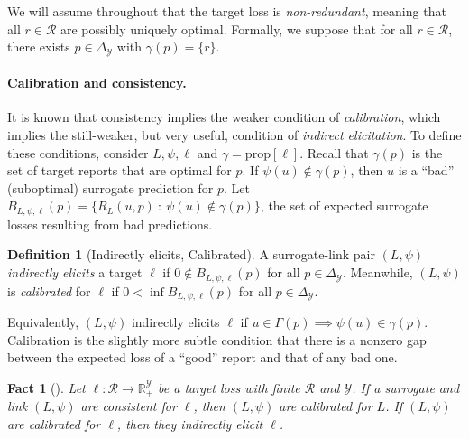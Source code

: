 \documentclass{article}
\newtheorem{fact}{Fact}
\theoremstyle{definition}\newtheorem{definition}{Definition}
\theoremstyle{definition}\newtheorem{assumption}{Assumption}
\newcommand{\reals}{\mathbb{R}}
\newcommand{\prop}[1]{\mathrm{prop}[#1]}
\newcommand{\simplex}{\Delta_\Y}
\newcommand{\R}{\mathcal{R}}
\newcommand{\Y}{\mathcal{Y}}
\begin{document}
We will assume throughout that the target loss is \emph{non-redundant}, meaning that all $r \in \R$ are possibly uniquely optimal.
Formally, we suppose that for all $r \in \R$, there exists $p \in \simplex$ with $\gamma(p) = \{r\}$.

\paragraph{Calibration and consistency.}
It is known that consistency implies the weaker condition of \emph{calibration}, which implies the still-weaker, but very useful, condition of \emph{indirect elicitation}.
To define these conditions, consider $L,\psi,\ell$ and $\gamma = \prop{\ell}$.
Recall that $\gamma(p)$ is the set of target reports that are optimal for $p$.
If $\psi(u) \not\in \gamma(p)$, then $u$ is a ``bad'' (suboptimal) surrogate prediction for $p$.
Let $B_{L,\psi,\ell}(p) = \{R_L(u,p) ~:~ \psi(u) \not\in \gamma(p)\}$, the set of expected surrogate losses resulting from bad predictions.
\begin{definition}[Indirectly elicits, Calibrated]
  A surrogate-link pair $(L,\psi)$ \emph{indirectly elicits} a target $\ell$ if $0 \not\in B_{L,\psi,\ell}(p)$ for all $p \in \simplex$.
  Meanwhile, $(L,\psi)$ is \emph{calibrated} for $\ell$ if $0 < \inf B_{L,\psi,\ell}(p)$ for all $p \in \simplex$.
\end{definition}
Equivalently, $(L,\psi)$ indirectly elicits $\ell$ if $u \in \Gamma(p) \implies \psi(u) \in \gamma(p)$.
Calibration is the slightly more subtle condition that there is a nonzero gap between the expected loss of a ``good'' report and that of any bad one.
\begin{fact}[\cite{bartlett2006convexity,steinwart2008support}]
  \label{fact:consistent-calibrated-elicits}
  Let $\ell: \R \to \reals_+^{\Y}$ be a target loss with finite $\R$ and $\Y$.
  If a surrogate and link $(L,\psi)$ are consistent for $\ell$, then $(L,\psi)$ are calibrated for $L$.
  If $(L,\psi)$ are calibrated for $\ell$, then they indirectly elicit $\ell$.
\end{fact}

\end{document}
